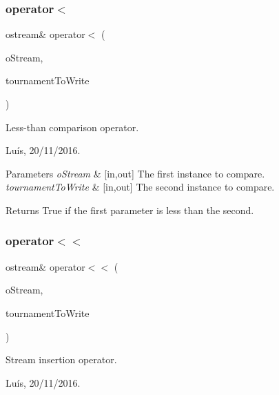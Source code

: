 \subsubsection{\texorpdfstring{operator$<$}{operator<}}
{\footnotesize\ttfamily ostream\& operator$<$ (\begin{DoxyParamCaption}\item[{ostream \&}]{o\+Stream,  }\item[{\hyperlink{class_tournament}{Tournament} \&}]{tournament\+To\+Write }\end{DoxyParamCaption})\hspace{0.3cm}{\ttfamily [friend]}}



Less-\/than comparison operator. 

Luís, 20/11/2016. 


\begin{DoxyParams}{Parameters}
{\em o\+Stream} & \mbox{[}in,out\mbox{]} The first instance to compare. \\
\hline
{\em tournament\+To\+Write} & \mbox{[}in,out\mbox{]} The second instance to compare. \\
\hline
\end{DoxyParams}


\begin{DoxyReturn}{Returns}
True if the first parameter is less than the second. 
\end{DoxyReturn}
\hypertarget{class_tournament_a30a1cb2d3a53d0cc6c77c5f29449305c}{}\label{class_tournament_a30a1cb2d3a53d0cc6c77c5f29449305c} 
\subsubsection{\texorpdfstring{operator$<$$<$}{operator<<}}
{\footnotesize\ttfamily ostream\& operator$<$$<$ (\begin{DoxyParamCaption}\item[{ostream \&}]{o\+Stream,  }\item[{\hyperlink{class_tournament}{Tournament} \&}]{tournament\+To\+Write }\end{DoxyParamCaption})\hspace{0.3cm}{\ttfamily [friend]}}



Stream insertion operator. 

Luís, 20/11/2016. 


